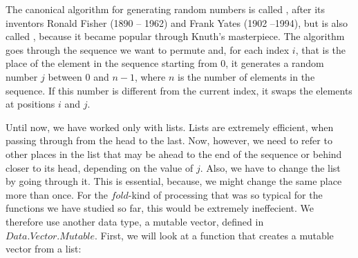 \documentclass{scrreprt}
\newcommand{\Conid}[1]{\mathit{#1}}
\newcommand{\Varid}[1]{\mathit{#1}}
\begin{document}
The canonical algorithm for generating random numbers
is called , 
after its inventors Ronald Fisher (1890 -- 1962)
and Frank Yates (1902 --1994), but is also called
, because it became popular through
Knuth's masterpiece.
The algorithm goes through the sequence
we want to permute and, for each index $i$,
that is the place of the element in the sequence
starting from 0, it generates a random number $j$
between 0 and $n-1$, where $n$ is the number
of elements in the sequence.
If this number is different from the current
index, it swaps the elements at positions $i$ and $j$.

Until now, we have worked only with lists.
Lists are extremely efficient, when passing through
from the head to the last.
Now, however, we need to refer to other places
in the list that may be ahead to the end of the sequence
or behind closer to its head,
depending on the value of $j$.
Also, we have to change the list by going through it.
This is essential, because, we might change 
the same place more than once.
For the \ensuremath{\Varid{fold}}-kind of processing that was
so typical for the functions we have studied so far,
this would be extremely ineffecient.
We therefore use another data type,
a mutable vector, defined in \ensuremath{\Conid{\Conid{Data}.\Conid{Vector}.Mutable}}.
First, we will look at a function that creates
a mutable vector from a list:
\end{document}

